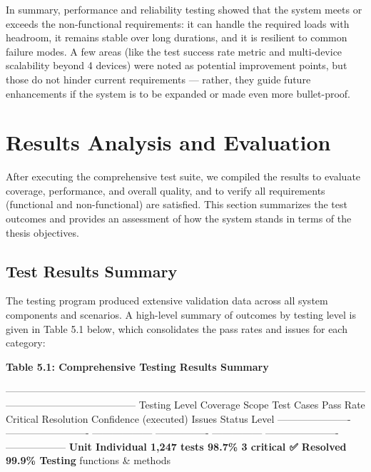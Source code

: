 \documentclass[11pt,a4paper]{report}
\begin{document}
{In summary, performance and reliability testing showed that the system
meets or exceeds the non-functional requirements: it can handle the
required loads with headroom, it remains stable over long durations, and
it is resilient to common failure modes. A few areas (like the test
success rate metric and multi-device scalability beyond 4 devices) were
noted as potential improvement points, but those do not hinder current
requirements --- rather, they guide future enhancements if the system is
to be expanded or made even more bullet-proof.

\section{Results Analysis and Evaluation}

After executing the comprehensive test suite, we compiled the results to
evaluate coverage, performance, and overall quality, and to verify all
requirements (functional and non-functional) are satisfied. This section
summarizes the test outcomes and provides an assessment of how the
system stands in terms of the thesis objectives.

\subsection{Test Results Summary}

The testing program produced extensive validation data across all system
components and scenarios. A high-level summary of outcomes by testing
level is given in Table 5.1 below, which consolidates the pass rates and
issues for each category:

\textbf{Table 5.1: Comprehensive Testing Results Summary}

  ---------------------------------------------------------------------------------------------------------------------------------------------------
  Testing Level   Coverage Scope    Test Cases   Pass Rate   Critical   Resolution      Confidence
                                    (executed)               Issues     Status          Level
  ---------------------- ------------------------- ------------------ ---------------- --------------- ---------------------- ------------------
  \textbf{Unit          Individual        1,247 tests  98.7\%       3 critical ✅ Resolved     99.9\%
  Testing}       functions \&                                                           
                  methods                                                               

}
\end{document}
